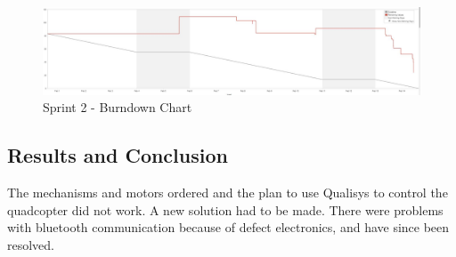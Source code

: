 \begin{figure}[h]
        \centering
        \includegraphics[width = 1
        \textwidth]{VAPIQ-PICTURES//SprintBD2}
         \caption{Sprint 2 - Burndown Chart}
        \label{fig:bds2}
    \end{figure}    

\subsection{Results and Conclusion}

The mechanisms and motors ordered and the plan to use Qualisys to control the quadcopter did not work. A new solution had to be made. There were problems with bluetooth communication because of defect electronics, and have since been resolved. 

